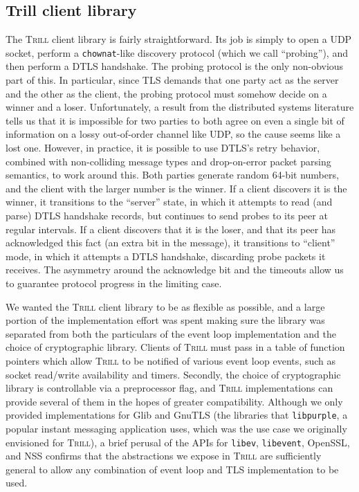 \documentclass[11pt]{article}
\newcommand{\Trill}{\textsc{Trill}\xspace}
\begin{document}
\subsection{Trill client library}
The \Trill client library is fairly straightforward. Its job is simply to open a
UDP socket, perform a \verb`chownat`-like discovery protocol (which we call
``probing''), and then perform a DTLS handshake. The probing protocol is the
only non-obvious part of this. In particular, since TLS demands that one party
act as the server and the other as the client, the probing protocol must somehow
decide on a winner and a loser. Unfortunately, a result from the distributed
systems literature tells us that it is impossible for two parties to both agree
on even a single bit of information on a lossy out-of-order channel like UDP, so
the cause seems like a lost one. However, in practice, it is possible to use
DTLS's retry behavior, combined with non-colliding message types and
drop-on-error packet parsing semantics, to work around this. Both parties
generate random 64-bit numbers, and the client with the larger number is the
winner. If a client discovers it is the winner, it transitions to the ``server''
state, in which it attempts to read (and parse) DTLS handshake records, but
continues to send probes to its peer at regular intervals. If a client discovers
that it is the loser, and that its peer has acknowledged this fact (an extra bit
in the message), it transitions to ``client'' mode, in which it attempts a DTLS
handshake, discarding probe packets it receives. The asymmetry around the
acknowledge bit and the timeouts allow us to guarantee protocol progress in the
limiting case.

We wanted the \Trill client library to be as flexible as possible, and a large
portion of the implementation effort was spent making sure the library was
separated from both the particulars of the event loop implementation and the
choice of cryptographic library. Clients of \Trill must pass in a table of
function pointers which allow \Trill to be notified of various event loop
events, such as socket read/write availability and timers.  Secondly, the choice
of cryptographic library is controllable via a preprocessor flag, and \Trill
implementations can provide several of them in the hopes of greater
compatibility. Although we only provided implementations for Glib and GnuTLS
(the libraries that \verb`libpurple`, a popular instant messaging application
uses, which was the use case we originally envisioned for \Trill), a brief
perusal of the APIs for \verb`libev`, \verb`libevent`, OpenSSL, and NSS confirms
that the abstractions we expose in \Trill are sufficiently general to allow any
combination of event loop and TLS implementation to be used.
\end{document}
